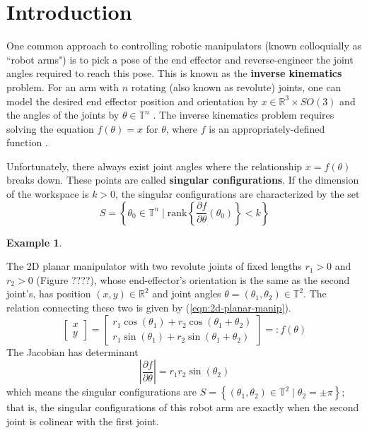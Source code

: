 \documentclass[12pt]{article}
\theoremstyle{definition}
\newtheorem{example}{Example}
\begin{document}
    
\section{Introduction}
One common approach to controlling robotic manipulators 
(known colloquially as ``robot arms") is to pick a pose of the end effector and
reverse-engineer the joint angles required to reach this pose. This is known as
the \textbf{inverse kinematics} problem. For an arm with \(n\) rotating 
(also known as revolute) joints, one can model the desired end effector position
and orientation by \(x \in \mathbb{R}^3 \times SO(3)\) and the angles of the
joints by \(\theta \in \mathbb{T}^n\) \cite{robots-fiber-bundles}. 
The inverse kinematics problem requires solving the
equation \(f(\theta) = x\) for \(\theta\), where \(f\) is an 
appropriately-defined function \cite{program-kin-red-manips}.

Unfortunately, there always exist joint angles where the relationship 
\(x = f(\theta)\) breaks down. These points are called 
\textbf{singular configurations}. If the dimension of the workspace is 
\(k > 0\), the singular configurations are characterized by the set
\[
    S = \left\{ \theta_0 \in \mathbb{T}^n \mid 
    \text{rank}\left\{
        \frac{\partial f}{\partial\theta}(\theta_0) 
    \right\} < k \right\}
\]

\begin{example}
    \begin{figure}[h]

        \caption{}\label{fig:2-link-arm}
    \end{figure}
    The 2D planar manipulator with two revolute joints of fixed lengths \(r_1 > 0\)
and \(r_2 > 0\) (Figure ????), whose end-effector's orientation is the same
as the second joint's, has position \((x,y) \in \mathbb{R}^2\) and joint angles 
\(\theta = (\theta_1,\theta_2) \in \mathbb{T}^2\). 
The relation connecting these two is given by (\ref{eqn:2d-planar-manip}).
\begin{equation}\label{eqn:2d-planar-manip}
    \begin{bmatrix}x \\ y \end{bmatrix}
    = \begin{bmatrix} 
        r_1\cos(\theta_1) + r_2\cos(\theta_1 + \theta_2) \\
        r_1\sin(\theta_1) + r_2\sin(\theta_1 + \theta_2)
    \end{bmatrix} =: f(\theta)
\end{equation}
The Jacobian has determinant
\[
    \left| \frac{\partial f}{\partial \theta} \right| = r_1r_2\sin(\theta_2)
\]
which means the singular configurations are 
\(S = \left\{ (\theta_1,\theta_2) \in \mathbb{T}^2 \mid \theta_2 = \pm\pi\right\}\); 
that is, the singular configurations of this robot arm are exactly when the
second joint is colinear with the first joint.
\end{example}
\end{document}
